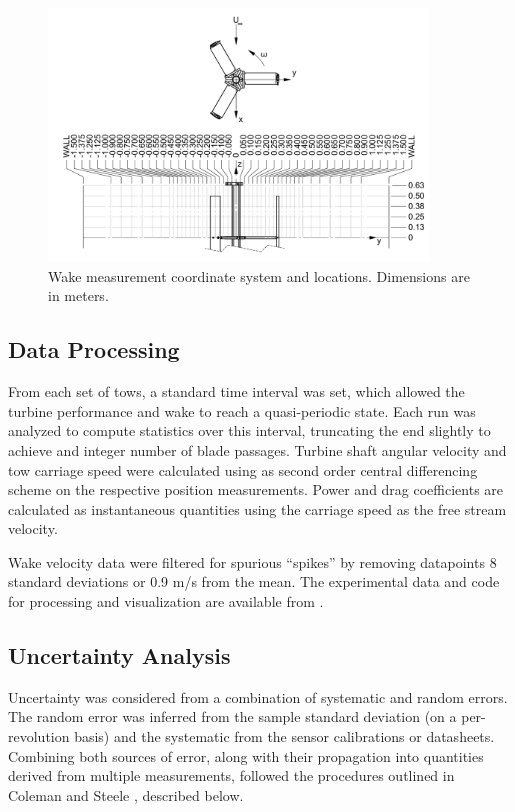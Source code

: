 \documentclass[energies,article,accept,moreauthors,pdftex,12pt,a4paper]{mdpi}
\begin{document}
\begin{figure}
\centering

\includegraphics[width=0.9\textwidth]{figures/turbine_coordinate_system}

\caption{Wake measurement coordinate system and locations. Dimensions are in
    meters.}

\label{fig:wake-locations}
\end{figure}


\subsection{Data Processing}

From each set of tows, a standard time interval was set, which allowed the
turbine performance and wake to reach a quasi-periodic state. Each run was
analyzed to compute statistics over this interval, truncating the end slightly
to achieve and integer number of blade passages. Turbine shaft angular velocity
and tow carriage speed were calculated using as second order central
differencing scheme on the respective position measurements. Power and drag
coefficients are calculated as instantaneous quantities using the carriage speed
as the free stream velocity.

Wake velocity data were filtered for spurious ``spikes'' by removing datapoints
8 standard deviations or 0.9 m/s from the mean. The experimental data and code
for processing and visualization are available from
\cite{Bachant2015-RVAT-Re-dep-data}.


\subsection{Uncertainty Analysis}

Uncertainty was considered from a combination of systematic and random errors.
The random error was inferred from the sample standard deviation (on a
per-revolution basis) and the systematic from the sensor calibrations or
datasheets. Combining both sources of error, along with their propagation into
quantities derived from multiple measurements, followed the procedures outlined
in Coleman and Steele \cite{ColemanSteele}, described below.
\end{document}
